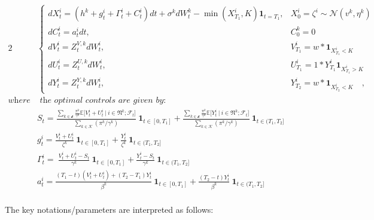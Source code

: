 \documentclass[a4paper,10pt]{article}
\newcommand{\1}{\mathbf{1}}
\begin{document}
\begin{alignat}{2}
    &\begin{cases}
        dX_t^{i} =(h^{k}+g_t^{i}+\Gamma_t^{i}+C_t^{i})dt + \sigma^{k}dW_t^{k} - \min\left(X_{T_1}^i,K\right)\mathbf{1}_{t=T_1},  &X_0^{i} = \zeta^{i} \sim \mathcal{N}(v^k,\eta^k)\\
        dC_t^{i} = a_t^{i}dt ,  &C_0^{k}=0 \\ 
        dV_t^{i} = Z_t^{V,k}dW_t^{i},  &V_{T_1}^{i}=w*\mathbf{1}_{X^i_{T_1}<K} \\
        dU_t^{i} = Z_t^{U,k}dW_t^{i},  &U_{T_1}^{i}=1*Y_{T_1}^i\mathbf{1}_{X^i_{T_1}>K}\\
        dY_t^{i} = Z_t^{Y,k}dW_t^{i},  &Y_{T_2}^{i}=w*\mathbf{1}_{X^i_{T_2}<K}\quad,
    \end{cases} \\
    \textit{where} &\textit{ the optimal controls are given by:}\\
    & S_t = \frac{\sum\limits_{k \in \mathcal{k}} {\frac{\pi^k}{\gamma^k}\mathbb{E}\big[ V_t^i +U_t^i ~|~ i \in \mathfrak{N}^k; \mathcal{F}_t \big]}}{\sum\limits_{k \in \mathcal{K}}{(\pi^k/\gamma^k)}} 
            ~\mathbf{1}_{t\in [0,T_1]} +
            \frac{\sum\limits_{k \in \mathcal{k}} {\frac{\pi^k}{\gamma^k}\mathbb{E}\big[ Y_t^i ~|~ i \in \mathfrak{N}^k; \mathcal{F}_t \big]}}{\sum\limits_{k \in \mathcal{K}}{(\pi^k/\gamma^k)}} 
            ~\mathbf{1}_{t\in (T_1,T_2]} \\
    & g_t^{i} = \frac{V_t^{i}+U_t^{i}}{\zeta^{k}} ~\mathbf{1}_{t\in [0,T_1]}
                + \frac{Y_t^{i}}{\zeta^{k}} ~\mathbf{1}_{t\in (T_1,T_2]} \\
    & \Gamma_t^{i} =\  \frac{V_t^{i}+U_t^{i}-S_t}{\gamma^{k}} ~\mathbf{1}_{t\in [0,T_1]}
                    + \frac{Y_t^{i}-S_t}{\gamma^{k}} ~\mathbf{1}_{t\in (T_1,T_2]} \\
    & a_t^{i} =\frac{(T_1-t)(V_t^{i}+U_t^{i})+(T_2-T_1)Y^i_t}{\beta^{k}} ~\mathbf{1}_{t\in [0,T_1]}
                + \frac{(T_2-t)Y_t^{i}}{\beta^{k}} ~\mathbf{1}_{t\in (T_1,T_2]} \\
\end{alignat}

The key notations/parameters are interpreted as follows:
\end{document}
